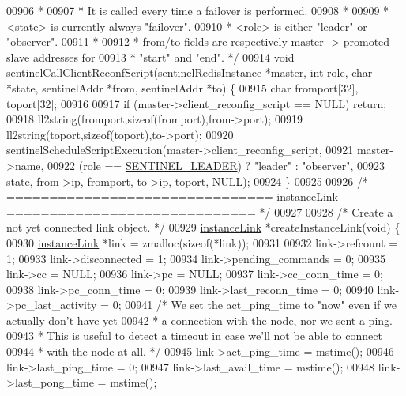 \begin{DoxyCode}
{{{{{{{{{{{{{{{00906 \textcolor{comment}{ *}
00907 \textcolor{comment}{ * It is called every time a failover is performed.}
00908 \textcolor{comment}{ *}
00909 \textcolor{comment}{ * <state> is currently always "failover".}
00910 \textcolor{comment}{ * <role> is either "leader" or "observer".}
00911 \textcolor{comment}{ *}
00912 \textcolor{comment}{ * from/to fields are respectively master -> promoted slave addresses for}
00913 \textcolor{comment}{ * "start" and "end". */}
00914 \textcolor{keywordtype}{void} sentinelCallClientReconfScript(sentinelRedisInstance *master, \textcolor{keywordtype}{int} role, \textcolor{keywordtype}{char} *state, sentinelAddr
       *from, sentinelAddr *to) \{
00915     \textcolor{keywordtype}{char} fromport[32], toport[32];
00916 
00917     \textcolor{keywordflow}{if} (master->client\_reconfig\_script == NULL) \textcolor{keywordflow}{return};
00918     ll2string(fromport,\textcolor{keyword}{sizeof}(fromport),from->port);
00919     ll2string(toport,\textcolor{keyword}{sizeof}(toport),to->port);
00920     sentinelScheduleScriptExecution(master->client\_reconfig\_script,
00921         master->name,
00922         (role == \hyperlink{sentinel_8c_a896cefcd7c6cbd3467b2387ec944fffd}{SENTINEL\_LEADER}) ? \textcolor{stringliteral}{"leader"} : \textcolor{stringliteral}{"observer"},
00923         state, from->ip, fromport, to->ip, toport, NULL);
00924 \}
00925 
00926 \textcolor{comment}{/* =============================== instanceLink ============================= */}
00927 
00928 \textcolor{comment}{/* Create a not yet connected link object. */}
00929 \hyperlink{structinstanceLink}{instanceLink} *createInstanceLink(\textcolor{keywordtype}{void}) \{
00930     \hyperlink{structinstanceLink}{instanceLink} *link = zmalloc(\textcolor{keyword}{sizeof}(*link));
00931 
00932     link->refcount = 1;
00933     link->disconnected = 1;
00934     link->pending\_commands = 0;
00935     link->cc = NULL;
00936     link->pc = NULL;
00937     link->cc\_conn\_time = 0;
00938     link->pc\_conn\_time = 0;
00939     link->last\_reconn\_time = 0;
00940     link->pc\_last\_activity = 0;
00941     \textcolor{comment}{/* We set the act\_ping\_time to "now" even if we actually don't have yet}
00942 \textcolor{comment}{     * a connection with the node, nor we sent a ping.}
00943 \textcolor{comment}{     * This is useful to detect a timeout in case we'll not be able to connect}
00944 \textcolor{comment}{     * with the node at all. */}
00945     link->act\_ping\_time = mstime();
00946     link->last\_ping\_time = 0;
00947     link->last\_avail\_time = mstime();
00948     link->last\_pong\_time = mstime();
}}}}}}}}}}}}}}}
\end{DoxyCode}
